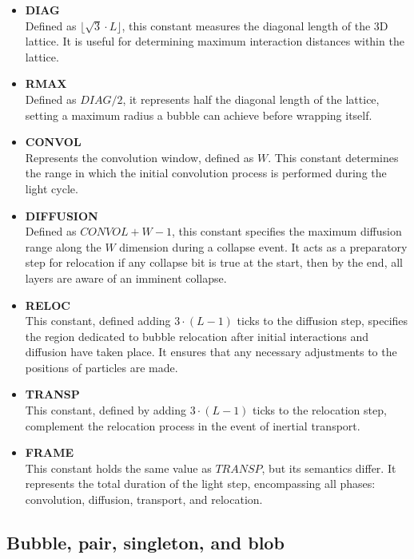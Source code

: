 \documentclass[12pt,english]{article}
\begin{document}
\begin{itemize}
\item \textbf{DIAG}\\
Defined as $ \lfloor \sqrt{3} \cdot L \rfloor$, this constant measures the diagonal length of the 3D lattice. It is useful for determining maximum interaction distances within the lattice.

\item \textbf{RMAX}\\
Defined as $DIAG/2$, it represents half the diagonal length of the lattice, setting a maximum radius a bubble can achieve before wrapping itself.

\item \textbf{CONVOL}\\
Represents the convolution window, defined as $W$. This constant determines the range in which the initial convolution process is performed during the light cycle.

\item \textbf{DIFFUSION} \\
Defined as \(CONVOL + W - 1\), this constant specifies the maximum diffusion range along the \(W\) dimension during a collapse event. It acts as a preparatory step for relocation if any collapse bit is true at the start, then by the end, all layers are aware of an imminent collapse.

\item \textbf{RELOC}\\
This constant, defined adding $3\cdot(L-1)$ ticks to the diffusion step, specifies the region dedicated to bubble relocation after initial interactions and diffusion have taken place. It ensures that any necessary adjustments to the positions of particles are made.

\item \textbf{TRANSP} \\  
This constant, defined by adding \(3\cdot (L-1)\) ticks to the relocation step, complement the relocation process in the event of inertial transport.

\item \textbf{FRAME}\\
This constant holds the same value as $TRANSP$, but its semantics differ. It represents the total duration of the light step, encompassing all phases: convolution, diffusion, transport, and relocation.

\end{itemize}

\subsection{Bubble, pair, singleton, and blob} \label{subsec:pairs}
\end{document}

